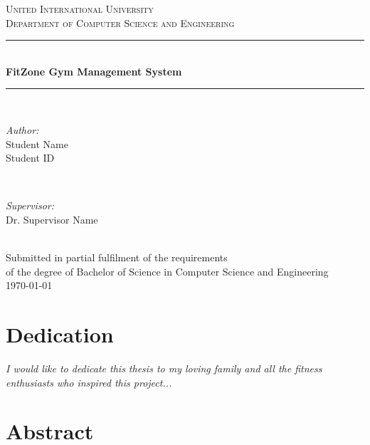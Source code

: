 \documentclass[12pt,a4paper]{report}
\newcommand{\HRule}{\rule{\linewidth}{0.5mm}}
\begin{document}
\begin{titlepage}
\center

\textsc{\LARGE United International University}\\[1.5cm]
\textsc{\Large Department of Computer Science and Engineering}\\[0.5cm]

\HRule \\[0.4cm]
{\huge \bfseries FitZone Gym Management System}\\[0.4cm]
\HRule \\[1.5cm]

\begin{minipage}{0.4\textwidth}
\begin{flushleft} \large
\emph{Author:}\\
Student Name\\
Student ID
\end{flushleft}
\end{minipage}
~
\begin{minipage}{0.4\textwidth}
\begin{flushright} \large
\emph{Supervisor:} \\
Dr. Supervisor Name
\end{flushright}
\end{minipage}\\[2cm]

{\large Submitted in partial fulfilment of the requirements\\
of the degree of Bachelor of Science in Computer Science and Engineering}\\[2cm]

{\large \today}\\[2cm]

\vfill

\end{titlepage}

\chapter*{Dedication}
\thispagestyle{empty}
\vspace*{2in}
\begin{center}
\emph{I would like to dedicate this thesis to my loving family and all the fitness enthusiasts who inspired this project...}
\end{center}
\newpage

\chapter*{Abstract}
\end{document}
